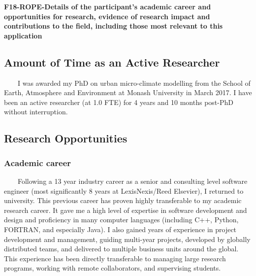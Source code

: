 \noindent \textbf{F18-ROPE-Details of the participant's academic career and opportunities for research, evidence of research impact and contributions to the field, including those most relevant to this application }\\ \noindent 





\subsection*{\TitleFont Amount of Time as an Active Researcher}

~~~~I was awarded my PhD on urban micro-climate modelling from the School of Earth, Atmosphere and Environment at Monash University in March 2017. I have been an active researcher (at 1.0 FTE) for 4 years and 10 months post-PhD without interruption.

\subsection*{\TitleFont Research Opportunities}

\subsubsection*{\textbf{Academic career}}



~~~~Following a 13 year industry career as a senior and consulting level software engineer (most significantly 8 years at LexisNexis/Reed Elsevier), I returned to university. This previous career has proven highly transferable to my academic research career. It gave me a high level of expertise in software development and design and proficiency in many computer languages (including C++, Python, FORTRAN, and especially Java). I also gained years of experience in project development and management, guiding multi-year projects, developed by globally distributed teams, and delivered to multiple business units around the global. This experience has been directly transferable to managing large research programs, working with remote collaborators, and supervising students.

